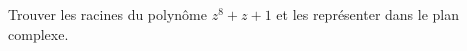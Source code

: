 \begin{exercice}\label{exoSC_serie3-0001}

	Trouver les racines du polynôme $z^8+z+1$ et les représenter dans le plan complexe.

\end{exercice}
